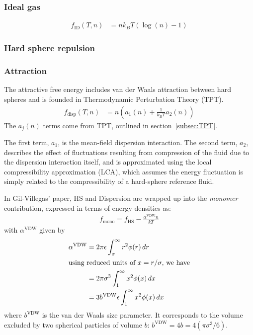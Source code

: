 \documentclass[letterpaper,twocolumn,amsmath,amssymb,prb]{revtex4-1}
\newcommand{\kT}{\ensuremath{k_BT}}
\newcommand{\fid}{\ensuremath{f_\text{ID}(T,n)}}
\newcommand{\fdisp}{\ensuremath{f_\text{disp}(T,n)}}
\newcommand{\1}{\ensuremath{\textbf{r}_1}}
\newcommand{\2}{\ensuremath{\textbf{r}_2}}
\begin{document}
\subsubsection{Ideal gas}\label{sub2sec:ID}
\begin{align}
  \fid &= n\kT\left(\log(n) - 1\right)
\end{align}

\subsubsection{Hard sphere repulsion}\label{sub2sec:HS}


\subsubsection{Attraction}\label{sub2sec:disp}
The attractive free energy includes van der Waals attraction between hard spheres and is founded in Thermodynamic Perturbation Theory (TPT).
\begin{align}
  \fdisp &= n \left( a_1(n) + \frac{1}{\kT}a_2(n) \right)
\end{align}
The $a_j(n)$ terms come from TPT, outlined in section~\ref{subsec:TPT}.

The first term, $a_1$, is the mean-field dispersion interaction. The second term, $a_2$, describes the effect of fluctuations resulting from compression of the fluid due to the dispersion interaction itself, and is approximated using the local compressibility approximation (LCA), which assumes the energy fluctuation is simply related to the compressibility of a hard-sphere reference fluid\cite{Barker76}.

In Gil-Villegas' paper, HS and Dispersion are wrapped up into the
\textit{monomer} contribution, expressed in terms of energy densities
as:
\begin{align}
  f_\text{mono} = f_\text{HS} - \frac{\alpha^\text{VDW}n}{kT}
\end{align}
with $\alpha^\text{VDW}$ given by
\begin{align}
  \alpha^\text{VDW} &= 2\pi\epsilon\int_\sigma^\infty r^2\phi(r)\,dr \\
  \intertext{using reduced units of $x = r/\sigma$, we have}
  &= 2\pi\sigma^3\int_1^\infty x^2\phi(x)\,dx \\
  &= 3b^\text{VDW}\epsilon\int_1^\infty x^2\phi(x)\,dx
\end{align}
where $b^\text{VDW}$ is the van der Waals size parameter. It corresponds to the volume excluded by two spherical particles of volume $b$: $b^\text{VDW} = 4b = 4\left(\pi\sigma^3/6\right)$.
\end{document}
